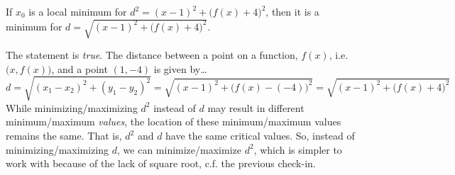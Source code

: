 \documentclass[11pt,letterpaper]{article}
\begin{document}
 If $x_0$ is a local minimum for $d^2= (x - 1)^2 + \big( f(x) + 4 \big)^2$, then it is a minimum for $d= \sqrt{(x - 1)^2 + \big( f(x) + 4 \big)^2}$. \pspace

\sol The statement is \textit{true}. The distance between a point on a function, $f(x)$, i.e. $\big(x, f(x) \big)$, and a point $(1, -4)$ is given by\dots
	\[
	d= \sqrt{(x_1 - x_2)^2 + (y_1 - y_2)^2}= \sqrt{(x - 1)^2 + \big(f(x) - (-4) \big)^2}= \sqrt{(x - 1)^2 + \big(f(x) + 4 \big)^2}
	\]
While minimizing/maximizing $d^2$ instead of $d$ may result in different minimum/maximum \textit{values}, the location of these minimum/maximum values remains the same. That is, $d^2$ and $d$ have the same critical values. So, instead of minimizing/maximizing $d$, we can minimize/maximize $d^2$, which is simpler to work with because of the lack of square root, c.f. the previous check-in. \pvspace{1.3cm}
\end{document}
